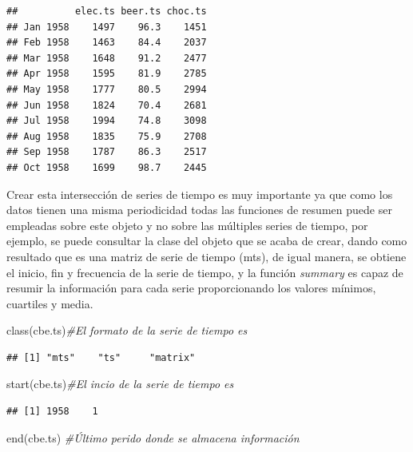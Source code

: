 \documentclass[
  spanish,
]{book}
\newenvironment{Shaded}{\begin{snugshade}}{\end{snugshade}}
\newcommand{\CommentTok}[1]{\textcolor[rgb]{0.56,0.35,0.01}{\textit{#1}}}
\newcommand{\FunctionTok}[1]{\textcolor[rgb]{0.00,0.00,0.00}{#1}}
\newcommand{\NormalTok}[1]{#1}
\theoremstyle{remark}
\begin{document}
\begin{verbatim}
##          elec.ts beer.ts choc.ts
## Jan 1958    1497    96.3    1451
## Feb 1958    1463    84.4    2037
## Mar 1958    1648    91.2    2477
## Apr 1958    1595    81.9    2785
## May 1958    1777    80.5    2994
## Jun 1958    1824    70.4    2681
## Jul 1958    1994    74.8    3098
## Aug 1958    1835    75.9    2708
## Sep 1958    1787    86.3    2517
## Oct 1958    1699    98.7    2445
\end{verbatim}

Crear esta intersección de series de tiempo es muy importante ya que como los datos tienen una misma periodicidad todas las funciones de resumen puede ser empleadas sobre este objeto y no sobre las múltiples series de tiempo, por ejemplo, se puede consultar la clase del objeto que se acaba de crear, dando como resultado que es una matriz de serie de tiempo (mts), de igual manera, se obtiene el inicio, fin y frecuencia de la serie de tiempo, y la función \emph{summary} es capaz de resumir la información para cada serie proporcionando los valores mínimos, cuartiles y media.

\begin{Shaded}
\begin{Highlighting}[]
\FunctionTok{class}\NormalTok{(cbe.ts)}\CommentTok{\#El formato de la serie de tiempo es}
\end{Highlighting}
\end{Shaded}

\begin{verbatim}
## [1] "mts"    "ts"     "matrix"
\end{verbatim}

\begin{Shaded}
\begin{Highlighting}[]
\FunctionTok{start}\NormalTok{(cbe.ts)}\CommentTok{\#El incio de la serie de tiempo es}
\end{Highlighting}
\end{Shaded}

\begin{verbatim}
## [1] 1958    1
\end{verbatim}

\begin{Shaded}
\begin{Highlighting}[]
\FunctionTok{end}\NormalTok{(cbe.ts) }\CommentTok{\#Último perido donde se almacena información}
\end{Highlighting}
\end{Shaded}
\end{document}
